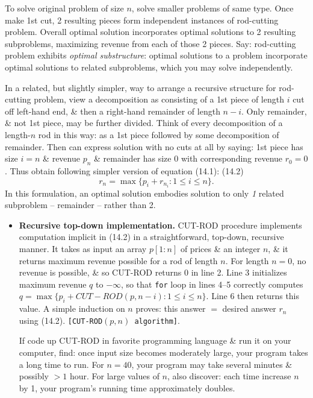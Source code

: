 \documentclass{article}
\begin{document}
\begin{itemize}
\begin{itemize}
\begin{itemize}
			To solve original problem of size $n$, solve smaller problems of same type. Once make 1st cut, 2 resulting pieces form independent instances of rod-cutting problem. Overall optimal solution incorporates optimal solutions to 2 resulting subproblems, maximizing revenue from each of those 2 pieces. Say: rod-cutting problem exhibits {\it optimal substructure}: optimal solutions to a problem incorporate optimal solutions to related subproblems, which you may solve independently.
			
			In a related, but slightly simpler, way to arrange a recursive structure for rod-cutting problem, view a decomposition as consisting of a 1st piece of length $i$ cut off left-hand end, \& then a right-hand remainder of length $n - i$. Only remainder, \& not 1st piece, may be further divided. Think of every decomposition of a length-$n$ rod in this way: as a 1st piece followed by some decomposition of remainder. Then can express solution with no cuts at all by saying: 1st piece has size $i = n$ \& revenue $p_n$ \& remainder has size 0 with corresponding revenue $r_0 = 0$. Thus obtain following simpler version of equation (14.1): (14.2)
			\begin{equation*}
				r_n = \max\{p_i + r_{n_i}:1\le i\le n\}.
			\end{equation*}
			In this formulation, an optimal solution embodies solution to only {\it1} related subproblem -- remainder -- rather than 2.
			\begin{itemize}
				\item {\bf Recursive top-down implementation.} CUT-ROD procedure implements computation implicit in (14.2) in a straightforward, top-down, recursive manner. It takes as input an array $p[1:n]$ of prices \& an integer $n$, \& it returns maximum revenue possible for a rod of length $n$. For length $n = 0$, no revenue is possible, \& so CUT-ROD returns 0 in line 2. Line 3 initializes maximum revenue $q$ to $-\infty$, so that {\tt for} loop in lines 4--5 correctly computes $q = \max\{p_i + CUT-ROD(p,n - i):1\le i\le n\}$. Line 6 then returns this value. A simple induction on $n$ proves: this answer $=$ desired answer $r_n$ using (14.2). {\tt[CUT-ROD$(p,n)$ algorithm]}.
				
				If code up CUT-ROD in favorite programming language \& run it on your computer, find: once input size becomes moderately large, your program takes a long time to run. For $n = 40$, your program may take several minutes \& possibly $> 1$ hour. For large values of $n$, also discover: each time increase $n$ by 1, your program's running time approximately doubles.
				

\end{itemize}
\end{itemize}
\end{itemize}
\end{itemize}
\end{document}

